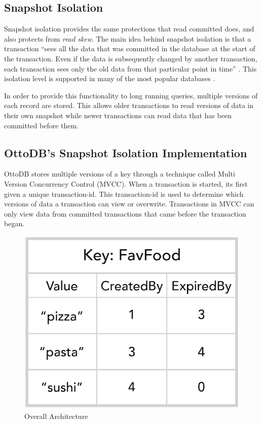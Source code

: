 \documentclass[conference]{IEEEtran}
\begin{document}
    \subsection{Snapshot Isolation}

    Snapshot isolation provides the same protections that read committed does, and also protects from \textit{read skew}. The main idea behind snapshot isolation is that a transaction “sees all the data that was committed in the database at the start of the transaction. Even if the data is subsequently changed by another transaction, each transaction sees only the old data from that particular point in time” \cite[p. 238]{b18}. This isolation level is supported in many of the most popular databases \cite[p. 239]{b18}. 
    
    In order to provide this functionality to long running queries, multiple versions of each record are stored. This allows older transactions to read versions of data in their own snapshot while newer transactions can read data that has been committed before them.

    \subsection{OttoDB's Snapshot Isolation Implementation}


    OttoDB stores multiple versions of a key through a technique called Multi Version Concurrency Control (MVCC). When a transaction is started, its first given a unique transaction-id. This transaction-id is used to determine which versions of data a transaction can view or overwrite. Transactions in MVCC can only view data from committed transactions that came before the transaction began.

    \begin{figure}[h]
    \centering
    \includegraphics[width=\columnwidth]{figures/MVCCDetail.png}
    \caption{Overall Architecture}
    \end{figure}
\end{document}

